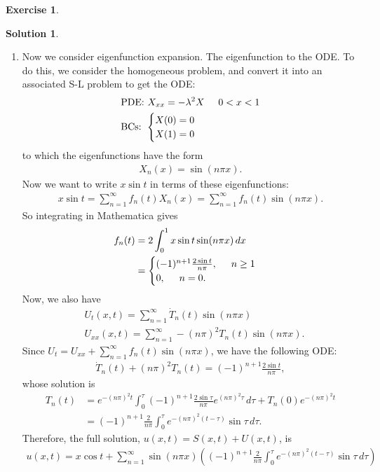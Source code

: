 \documentclass{article}
\theoremstyle{definition}
\newtheorem*{exer*}{Exercise}
\newtheorem*{sln*}{Solution}
\begin{document}
\begin{exer*}
\begin{sln*}
\begin{enumerate}
			\item Now we consider eigenfunction expansion. The eigenfunction to the ODE. To do this, we consider the homogeneous problem, and convert it into an associated S-L problem to get the ODE:
			\begin{align*}
			&\text{PDE: }  X_{xx} = -\lambda^2 X \hspace{0.5cm} 0 < x < 1\\
			&\text{BCs: } \begin{cases}
			X(0) = 0\\
			X(1) = 0
			\end{cases}
			\end{align*}
			to which the eigenfunctions have the form
			\begin{align*}
			X_n(x) = \sin(n\pi x).
			\end{align*}
			Now we want to write $x\sin t$ in terms of these eigenfunctions:
			\begin{align*}
			x\sin t = \sum^\infty_{n=1}f_n(t)X_n(x) = \sum^\infty_{n=1}f_n(t)\sin(n\pi x).
			\end{align*}
			So integrating in Mathematica gives
			\begin{align*}
			f_n(t) &= 2\int^1_0 x\sin t\sin(n\pi x)\,dx\\
			&= 
			\begin{cases}
			(-1)^{n+1}\frac{2\sin t}{n\pi}, \hspace{0.5cm} n \geq 1\\
			0, \hspace{0.5cm} n =0.
			\end{cases}
			\end{align*}
			Now, we also have 
			\begin{align*}
			&U_t(x,t) = \sum^\infty_{n=1}\dot{T}_n(t)\sin(n\pi x)\\
			&U_{xx}(x,t) = \sum^\infty_{n=1}-(n\pi)^2T_n(t)\sin(n\pi x).
			\end{align*}
			Since $U_t = U_{xx} + \sum^\infty_{n=1}f_n(t)\sin(n\pi x)$, we have the following ODE:
			\begin{align*}
			\dot{T}_n(t) + (n\pi)^2T_n(t) = (-1)^{n+1}\frac{2\sin t}{n\pi},
			\end{align*}
			whose solution is
			\begin{align*}
			T_n(t) &= e^{-(n\pi)^2t}\int^\tau_0 (-1)^{n+1}\frac{2\sin \tau}{n\pi}e^{(n\pi)^2\tau}\,d\tau + T_n(0)e^{-(n\pi)^2t} \\
			&= (-1)^{n+1}\frac{2}{n\pi}\int^\tau_0 e^{-(n\pi)^2(t-\tau)}\sin\tau \,d\tau.
			\end{align*}
			Therefore, the full solution, $u(x,t) = S(x,t) + U(x,t)$, is
			\begin{align*}
			\boxed{u(x,t) = x\cos t + \sum^\infty_{n=1}\sin(n\pi x)\left((-1)^{n+1}\frac{2}{n\pi}\int^\tau_0 e^{-(n\pi)^2(t-\tau)}\sin\tau \,d\tau\right)}
			\end{align*}
			

\end{enumerate}
\end{sln*}
\end{exer*}
\end{document}
